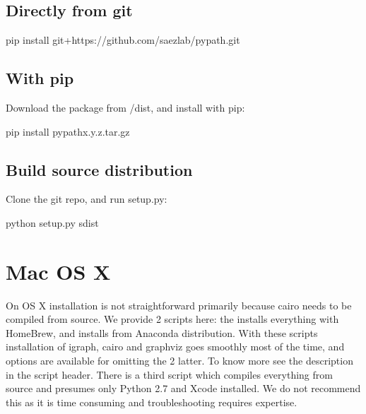 \documentclass[letterpaper,10pt,english]{sphinxmanual}
\begin{document}
\subsection{Directly from git}
\label{\detokenize{installation:directly-from-git}}
\begin{sphinxVerbatim}[commandchars=\\\{\}]
pip install git+https://github.com/saezlab/pypath.git
\end{sphinxVerbatim}


\subsection{With pip}
\label{\detokenize{installation:with-pip}}
Download the package from /dist, and install with pip:

\begin{sphinxVerbatim}[commandchars=\\\{\}]
pip install pypath\PYGZhy{}x.y.z.tar.gz
\end{sphinxVerbatim}


\subsection{Build source distribution}
\label{\detokenize{installation:build-source-distribution}}
Clone the git repo, and run setup.py:

\begin{sphinxVerbatim}[commandchars=\\\{\}]
python setup.py sdist
\end{sphinxVerbatim}


\section{Mac OS X}
\label{\detokenize{installation:mac-os-x}}
On OS X installation is not straightforward primarily because cairo needs to
be compiled from source. We provide 2 scripts here: the
 installs everything with HomeBrew, and
 installs from Anaconda distribution. With these
scripts installation of igraph, cairo and graphviz goes smoothly most of the
time, and options are available for omitting the 2 latter. To know more see
the description in the script header. There is a third script
 which compiles everything from source and presumes
only Python 2.7 and Xcode installed. We do not recommend this as it is time
consuming and troubleshooting requires expertise.
\end{document}
